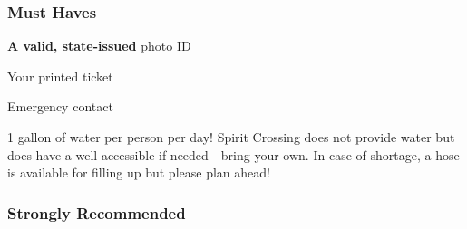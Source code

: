 
\subsubsection*{Must Haves}

\begin{multicols}{2}

\begin{checklist}
	\item \textbf{A valid, state-issued} photo ID
    \item Your printed ticket
    \item Emergency contact
    \item 1 gallon of water per person per day!  Spirit Crossing does not provide water but does have a well accessible if needed - bring your own. In case of shortage, a hose is available for filling up but please plan ahead!
\end{checklist}
\end{multicols}

\subsubsection*{Strongly Recommended}

